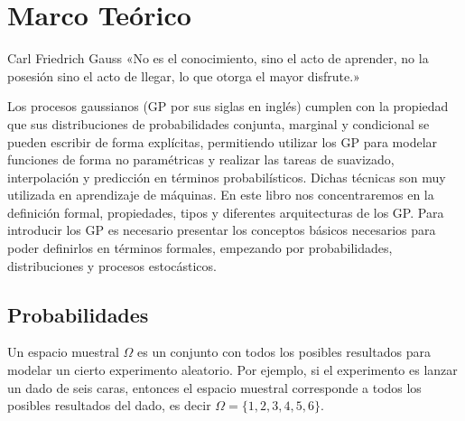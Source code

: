
\chapter{Marco Teórico}
\label{sec:introduction}

\begin{chapquote}{Carl Friedrich Gauss}
	«No es el conocimiento, sino el acto de aprender, no la posesión sino el acto de llegar, lo que otorga el mayor disfrute.»
\end{chapquote}




Los procesos gaussianos (GP por sus siglas en inglés) cumplen con la propiedad que sus distribuciones de probabilidades conjunta, marginal y condicional se pueden escribir de forma explícitas, permitiendo utilizar los GP para modelar funciones de forma no paramétricas y realizar las tareas de suavizado, interpolación y predicción en términos probabilísticos. Dichas técnicas son muy utilizada en aprendizaje de máquinas. En este libro nos concentraremos en la definición formal, propiedades, tipos y diferentes arquitecturas de los GP. Para introducir los GP es necesario presentar los conceptos básicos necesarios para poder definirlos en términos formales, empezando por probabilidades, distribuciones y procesos estocásticos.

\section{Probabilidades}
\label{sec:probability}

Un espacio muestral \(\Omega\) es un conjunto con todos los posibles resultados para modelar un cierto experimento aleatorio. Por ejemplo, si el experimento es lanzar un dado de seis caras, entonces el espacio muestral corresponde a todos los posibles resultados del dado, es decir \(\Omega = \{1, 2, 3, 4, 5, 6\}\).

